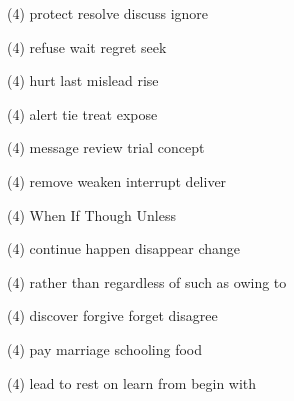 \item
\begin{tasks}(4)
	\task protect
	\task resolve
	\task discuss
	\task ignore
\end{tasks}
\item
\begin{tasks}(4)
	\task refuse
	\task wait
	\task regret
	\task seek
\end{tasks}
\item
\begin{tasks}(4)
	\task hurt
	\task last
	\task mislead
	\task rise
\end{tasks}
\item
\begin{tasks}(4)
	\task alert
	\task tie
	\task treat
	\task expose
\end{tasks}
\item
\begin{tasks}(4)
	\task message
	\task review
	\task trial
	\task concept
\end{tasks}
\item
\begin{tasks}(4)
	\task remove
	\task weaken
	\task interrupt
	\task deliver
\end{tasks}
\item
\begin{tasks}(4)
	\task When
	\task If
	\task Though
	\task Unless
\end{tasks}
\item
\begin{tasks}(4)
	\task continue
	\task happen
	\task disappear
	\task change
\end{tasks}
\item
\begin{tasks}(4)
	\task rather than
	\task regardless of
	\task such as
	\task owing to
\end{tasks}
\item
\begin{tasks}(4)
	\task discover
	\task forgive
	\task forget
	\task disagree
\end{tasks}
\item
\begin{tasks}(4)
	\task pay
	\task marriage
	\task schooling
	\task food
\end{tasks}
\item
\begin{tasks}(4)
	\task lead to
	\task rest on
	\task learn from
	\task begin with
\end{tasks}
\item
